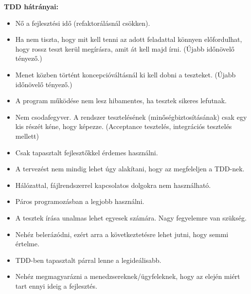 \textbf{TDD hátrányai:}
\hfill\\
\begin{itemize}
\item Nő a fejlesztési idő (refaktorálásnál csökken).
\item Ha nem tiszta, hogy mit kell tenni az adott feladattal könnyen előfordulhat, hogy rossz teszt kerül megírásra, amit át kell majd írni. (Újabb időnövelő tényező.)
\item Menet közben történt koncepcióváltásnál ki kell dobni a teszteket. (Újabb időnövelő tényező.)
\item A program működése nem lesz hibamentes, ha tesztek sikeres lefutnak.
\item Nem csodafegyver. A rendszer tesztelésének (minőségbiztosításának) csak egy kis részét kéne, hogy képezze. (Acceptance tesztelés, integrációs tesztelés mellett)
\item Csak tapasztalt fejlesztőkkel érdemes használni.
\item A tervezést nem mindig lehet úgy alakítani, hogy az megfeleljen a TDD-nek.
\item Hálózattal, fájlrendszerrel kapcsolatos dolgokra nem használható.
\item Páros programozásban a legjobb használni.
\item A tesztek írása unalmas lehet egyesek számára. Nagy fegyelemre van szükség.
\item Nehéz belerázódni, ezért arra a következtetésre lehet jutni, hogy semmi értelme.
\item TDD-ben tapasztalt párral lenne a legideálisabb.
\item Nehéz megmagyarázni a menedzsereknek/ügyfeleknek, hogy az elején miért tart ennyi ideig a fejlesztés.
\end{itemize}


